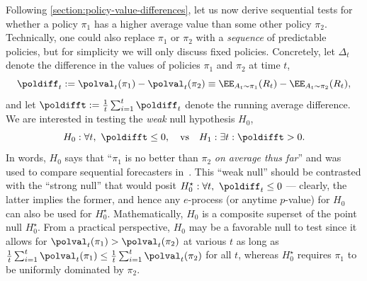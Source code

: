 Following \cref{section:policy-value-differences}, let us now derive sequential tests for whether a policy $\pi_1$ has a higher average value than some other policy $\pi_2$. Technically, one could also replace $\pi_1$ or $\pi_2$ with a \emph{sequence} of predictable policies, but for simplicity we will only discuss fixed policies. Concretely, let $\Delta_t$ denote the difference in the values of policies $\pi_1$ and $\pi_2$ at time $t$,
\begin{equation}
  \poldiff_t := \polval_t(\pi_1) - \polval_t(\pi_2) \equiv \EE_{A_t \sim \pi_1}(R_t) - \EE_{A_t \sim \pi_2}(R_t),
\end{equation}
and let $\poldifft := \frac{1}{t} \sum_{i=1}^t \poldiff_t$ denote the running average difference. We are interested in testing the \emph{weak} null hypothesis $H_0$,
\begin{equation}
  H_0 : \forall t,\  \poldifft \leq 0, ~~~\text{vs}~~~H_1 : \exists t :  \poldifft > 0.
\end{equation}
In words, $H_0$ says that ``$\pi_1$ is no better than $\pi_2$ \emph{on average thus far}'' and was used to compare sequential forecasters in~\citet{choe2021comparing}. This ``weak null'' should be contrasted with the ``strong null'' that would posit $H_0^\star : \forall t,\  \poldiff_t \leq 0$ --- clearly, the latter implies the former, and hence any $e$-process (or anytime $p$-value) for $H_0$ can also be used for $H_0^\star$. Mathematically, $H_0$ is a composite superset of the point null $H_0^\star$. From a practical perspective, $H_0$ may be a favorable null to test since it allows for $\polval_t(\pi_1) > \polval_t(\pi_2)$ at various $t$ as long as $\frac{1}{t} \sum_{i=1}^t\polval_t(\pi_1) \leq \frac{1}{t}\sum_{i=1}^t \polval_t(\pi_2)$ for all $t$, whereas $H_0^\star$ requires $\pi_1$ to be uniformly dominated by $\pi_2$.

